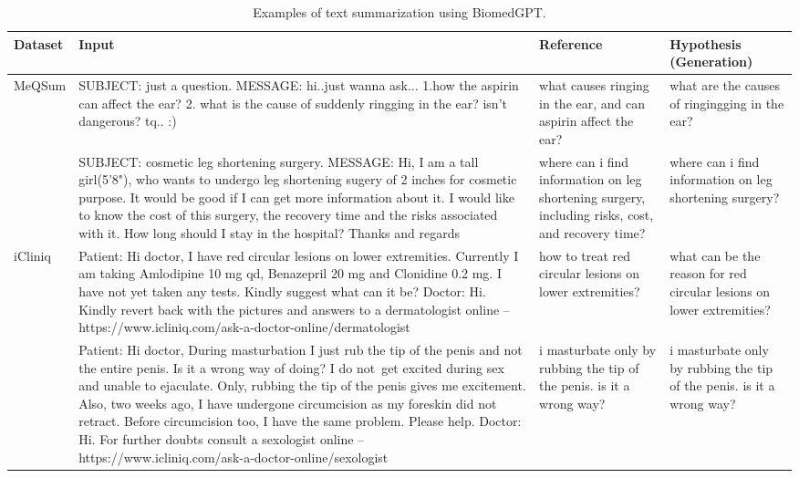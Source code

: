 \documentclass[10pt]{article} \usepackage[preprint]{tmlr}
\begin{document}
\clearpage
\begin{table*}
    \centering
    \small
    \caption{Examples of text summarization using BiomedGPT.} \label{tab:example_summary}
    \begin{tabularx}{\textwidth}{|>{\raggedright\arraybackslash}p{0.7in}|>{\raggedright\arraybackslash}X|>{\raggedright\arraybackslash}p{1.2in}|>{\raggedright\arraybackslash}p{1.2in}|}
    \hline
    \textbf{Dataset} & \textbf{Input} & \textbf{Reference} & \textbf{Hypothesis (Generation)} \\
    \hline
    MeQSum & SUBJECT: just a question. MESSAGE: hi..just wanna ask... 1.how the aspirin can affect the ear? 2. what is the cause of suddenly ringging in the ear? isn't dangerous? tq.. :) & what causes ringing in the ear, and can aspirin affect the ear? & what are the causes of ringingging in the ear? \\
    \cline{2-4}
     & SUBJECT: cosmetic leg shortening surgery. MESSAGE: Hi,  I am a tall girl(5'8"), who wants to undergo leg shortening sugery of 2 inches for cosmetic purpose. It would be good if I can get more information about it. I would like to know the cost of this surgery, the recovery time and the risks associated with it. How long should I stay in the hospital?  Thanks and regards & where can i find information on leg shortening surgery, including risks, cost, and recovery time? & where can i find information on leg shortening surgery? \\
    \hline
    iCliniq & Patient: Hi doctor, I have red circular lesions on lower extremities. Currently I am taking Amlodipine 10 mg qd, Benazepril 20 mg and Clonidine 0.2 mg. I have not yet taken any tests. Kindly suggest what can it be? Doctor: Hi. Kindly revert back with the pictures and answers to a dermatologist online -- https://www.icliniq.com/ask-a-doctor-online/dermatologist & how to treat red circular lesions on lower extremities? & what can be the reason for red circular lesions on lower extremities? \\
    \cline{2-4}
     & Patient: Hi doctor, During masturbation I just rub the tip of the penis and not the entire penis. Is it a wrong way of doing? I do not get excited during sex and unable to ejaculate. Only, rubbing the tip of the penis gives me excitement. Also, two weeks ago, I have undergone circumcision as my foreskin did not retract. Before circumcision too, I have the same problem. Please help. Doctor: Hi. For further doubts consult a sexologist online --https://www.icliniq.com/ask-a-doctor-online/sexologist & i masturbate only by rubbing the tip of the penis. is it a wrong way? & i masturbate only by rubbing the tip of the penis. is it a wrong way? \\

\end{tabularx}
\end{table*}
\end{document}

